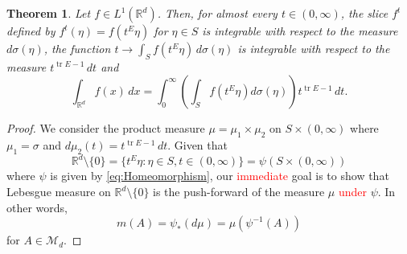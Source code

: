 \documentclass[11pt]{article}
\theoremstyle{theorem}
\newtheorem{theorem}{Theorem}[section]
\newcommand\tr{\operatorname{tr}}
\begin{document}
\begin{theorem}\label{thm:PolarIntegration}
Let $f\in L^1(\mathbb{R}^d)$. Then, for almost every $t\in (0,\infty) $, the slice $f^t$ defined by $f^t(\eta)=f(t^E\eta)$ for $\eta \in S$ is integrable with respect to the measure $d\sigma(\eta)$, the function $t\to \int_S f(t^E\eta)\,d \sigma(\eta)$ is integrable with respect to the measure $t^{\tr E-1}\,dt$ and
\begin{equation*}
\int_{\mathbb{R}^d} f(x)\,dx=\int_0^\infty \left(\int_S f(t^E\eta)d\sigma(\eta)\right) t^{\tr E-1}\,dt.
\end{equation*}
\end{theorem}
\begin{proof}
We consider the product measure $\mu=\mu_1\times\mu_2$ on $S\times (0,\infty)$ where $\mu_1=\sigma$ and $d\mu_2(t)=t^{\tr E-1}\,dt$. Given that
\begin{equation*}
\mathbb{R}^d\setminus \{0\}=\{t^E\eta:\eta\in S,t\in (0,\infty)\}=\psi\left(S\times (0,\infty)\right)
\end{equation*}
where $\psi$ is given by \eqref{eq:Homeomorphism}, our \textcolor{red}{immediate} goal is to show that Lebesgue measure on $\mathbb{R}^d\setminus \{0\}$ is the push-forward of the measure $\mu$ \textcolor{red}{under} $\psi$. In other words, 
\begin{equation*}
m(A)=\psi_*(d\mu)=\mu(\psi^{-1}(A))
\end{equation*}
for $A\in \mathcal{M}_d$. 


\end{proof}
\end{document}
